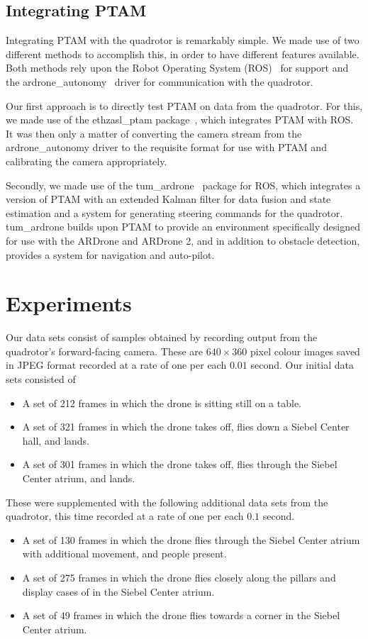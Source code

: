 \documentclass{acmsiggraph}
\begin{document}
\subsection{Integrating PTAM}
Integrating PTAM with the quadrotor is remarkably simple. We made use of two different methods to accomplish this, in order to have different features available. Both methods rely upon the Robot Operating System (ROS)~\cite{ros} for support and the ardrone\_autonomy~\cite{ardroneautonomy} driver for communication with the quadrotor.

Our first approach is to directly test PTAM on data from the quadrotor. For this, we made use of the ethzasl\_ptam package~\cite{ethzaslptam}, which integrates PTAM with ROS. It was then only a matter of converting the camera stream from the ardrone\_autonomy driver to the requisite format for use with PTAM and calibrating the camera appropriately.

Secondly, we made use of the tum\_ardrone~\cite{tumardrone} package for ROS, which integrates a version of PTAM with an extended Kalman filter for data fusion and state estimation and a system for generating steering commands for the quadrotor. tum\_ardrone builds upon PTAM to provide an environment specifically designed for use with the ARDrone and ARDrone 2, and in addition to obstacle detection, provides a system for navigation and auto-pilot.

\section{Experiments}
Our data sets consist of samples obtained by recording output from the quadrotor's forward-facing camera. These are $640 \times 360$ pixel colour images saved in JPEG format recorded at a rate of one per each $0.01$ second. Our initial data sets consisted of
\begin{itemize}
\item A set of 212 frames in which the drone is sitting still on a table.
\item A set of 321 frames in which the drone takes off, flies down a Siebel Center hall, and lands.
\item A set of 301 frames in which the drone takes off, flies through the Siebel Center atrium, and lands.
\end{itemize}
These were supplemented with the following additional data sets from the quadrotor, this time recorded at a rate of one per each $0.1$ second.
\begin{itemize}
\item A set of 130 frames in which the drone flies through the Siebel Center atrium with additional movement, and people present.
\item A set of 275 frames in which the drone flies closely along the pillars and display cases of in the Siebel Center atrium.
\item A set of 49 frames in which the drone flies towards a corner in the Siebel Center atrium.
\end{itemize}
\end{document}
